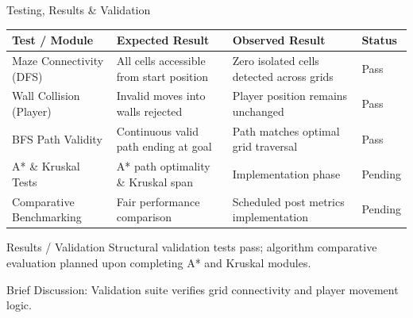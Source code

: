 \documentclass[aspectratio=169,11pt]{beamer}
\newcommand{\smallnote}[1]{%
\vspace{0.08cm}
{\scriptsize\color{GEUGrey}#1}
}
\begin{document}
\begin{frame}{Testing, Results \& Validation}
\vspace{-3.5mm}

\scriptsize

\begin{center}

\renewcommand{\arraystretch}{1.0}

\begin{tabularx}{\textwidth}
{@{}R{2.4cm}Y Y R{1.2cm}@{}}

\toprule
Test / Module &
Expected Result &
Observed Result &
Status\\
\midrule

Maze Connectivity (DFS) &
All cells accessible from start position &
Zero isolated cells detected across grids &
Pass\\

Wall Collision (Player) &
Invalid moves into walls rejected &
Player position remains unchanged &
Pass\\

BFS Path Validity &
Continuous valid path ending at goal &
Path matches optimal grid traversal &
Pass\\

A* \& Kruskal Tests &
A* path optimality \& Kruskal span &
Implementation phase &
Pending\\

Comparative Benchmarking &
Fair performance comparison &
Scheduled post metrics implementation &
Pending\\

\bottomrule

\end{tabularx}

\end{center}

\vspace{0mm}

\begin{block}{Results / Validation}
\footnotesize Structural validation tests pass; algorithm comparative evaluation planned upon completing A* and Kruskal modules.
\end{block}

\smallnote{
Brief Discussion: Validation suite verifies grid connectivity and player movement logic.
}

\end{frame}
\end{document}
